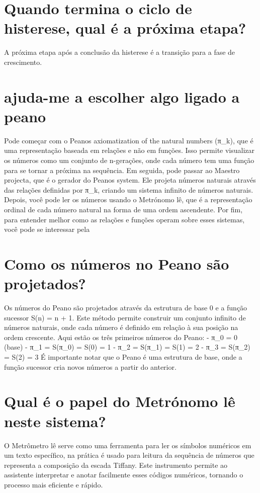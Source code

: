 \documentclass[11pt,a4paper]{article}
\begin{document}
\section{Quando termina o ciclo de histerese, qual é a próxima etapa?}
A próxima etapa após a conclusão da histerese é a transição para a fase de crescimento.

\section{ajuda-me a escolher algo ligado a peano}
Pode começar com o Peanos axiomatization of the natural numbers (π\_k), que é uma representação baseada em relações e não em funções. Isso permite visualizar os números como um conjunto de n-gerações, onde cada número tem uma função para se tornar a próxima na sequência. Em seguida, pode passar ao Maestro projecta, que é o gerador do Peanos system. Ele projeta números naturais através das relações definidas por π\_k, criando um sistema infinito de números naturais. Depois, você pode ler os números usando o Metrónomo lê, que é a representação ordinal de cada número natural na forma de uma ordem ascendente. Por fim, para entender melhor como as relações e funções operam sobre esses sistemas, você pode se interessar pela

\section{Como os números no Peano são projetados?}
Os números do Peano são projetados através da estrutura de base 0 e a função sucessor S(n) = n + 1. Este método permite construir um conjunto infinito de números naturais, onde cada número é definido em relação à sua posição na ordem crescente. Aqui estão os três primeiros números do Peano: - π\_0 = 0 (base) - π\_1 = S(π\_0) = S(0) = 1 - π\_2 = S(π\_1) = S(1) = 2 - π\_3 = S(π\_2) = S(2) = 3 É importante notar que o Peano é uma estrutura de base, onde a função sucessor cria novos números a partir do anterior.

\section{Qual é o papel do Metrónomo lê neste sistema?}
O Metrômetro lê serve como uma ferramenta para ler os símbolos numéricos em um texto específico, na prática é usado para leitura da sequência de números que representa a composição da escada Tiffany. Este instrumento permite ao assistente interpretar e anotar facilmente esses códigos numéricos, tornando o processo mais eficiente e rápido.
\end{document}
